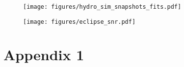 \documentclass[modern]{aastex631}
\begin{document}
\begin{figure}[t!]
    \begin{centering}
    \texttt{[image: figures/hydro\_sim\_snapshots\_fits.pdf]}
    \caption{}
    \label{fig:hydro_sim_snapshots_fits}
    \end{centering}
\end{figure}

\begin{figure}[t!]
    \begin{centering}
    \texttt{[image: figures/eclipse\_snr.pdf]}
    \caption{}
    \label{fig:eclipse_snr}
    \end{centering}
\end{figure}






\appendix
\section{Appendix 1}
\clearpage
\end{document}
